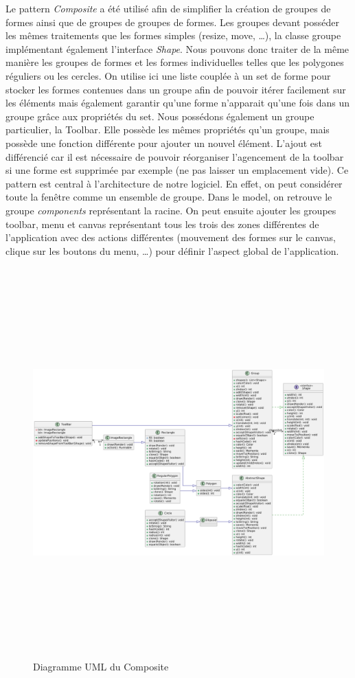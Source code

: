 \documentclass{article}
\begin{document}
Le pattern \textit{Composite} a été utilisé afin de simplifier la création de groupes de formes ainsi que de groupes de groupes de formes.
Les groupes devant posséder les mêmes traitements que les formes simples (resize, move, \ldots), la classe groupe implémentant également l'interface \textit{Shape}. Nous pouvons donc 
traiter de la même manière les groupes de formes et les formes individuelles telles que les polygones réguliers ou les cercles.  On utilise ici une liste couplée à un set de forme pour stocker
les formes contenues dans un groupe afin de pouvoir itérer facilement sur les éléments mais également garantir qu'une forme n'apparait qu'une fois dans un groupe grâce aux propriétés du set.
Nous possédons également un groupe particulier, la Toolbar. Elle possède les mêmes propriétés qu'un groupe, mais possède une fonction différente pour ajouter un nouvel élément. L'ajout est différencié
car il est nécessaire de pouvoir réorganiser l'agencement de la toolbar si une forme est supprimée par exemple (ne pas laisser un emplacement vide). Ce pattern est central à l'architecture de notre logiciel.
En effet, on peut considérer toute la fenêtre comme un ensemble de groupe. Dans le model, on retrouve le groupe \textit{components} représentant la racine. On peut ensuite ajouter les groupes toolbar, menu et
canvas représentant tous les trois des zones différentes de l'application avec des actions différentes (mouvement des formes sur le canvas, clique sur les boutons du menu, \ldots) pour définir l'aspect global de l'application. 
\begin{figure}[h]
    \centering
    \includegraphics[width=\textwidth,height=15.0cm,keepaspectratio]{Composite.png}
    \caption{Diagramme UML du Composite}
    \label{Composite}
\end{figure}
\FloatBarrier
\end{document}

